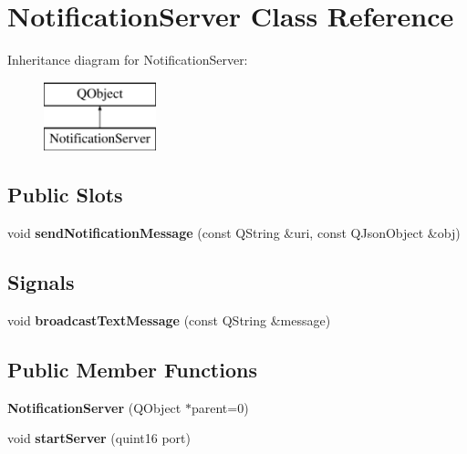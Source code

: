 \hypertarget{class_notification_server}{}\section{Notification\+Server Class Reference}
\label{class_notification_server}
Inheritance diagram for Notification\+Server\+:\begin{figure}[H]
\begin{center}
\leavevmode
\includegraphics[height=2.000000cm]{class_notification_server}
\end{center}
\end{figure}
\subsection*{Public Slots}
\begin{DoxyCompactItemize}
\item 
\mbox{\label{class_notification_server_a05d958280d812baf1e8a58c1be2f6537}} 
void {\bfseries send\+Notification\+Message} (const Q\+String \&uri, const Q\+Json\+Object \&obj)
\end{DoxyCompactItemize}
\subsection*{Signals}
\begin{DoxyCompactItemize}
\item 
\mbox{\label{class_notification_server_afd67abdb7fcb7a06878e85a3f9f203b2}} 
void {\bfseries broadcast\+Text\+Message} (const Q\+String \&message)
\end{DoxyCompactItemize}
\subsection*{Public Member Functions}
\begin{DoxyCompactItemize}
\item 
\mbox{\label{class_notification_server_a02f5762b8e41d1677163d13805d47906}} 
{\bfseries Notification\+Server} (Q\+Object $\ast$parent=0)
\item 
\mbox{\label{class_notification_server_a5e3a7df82c765939764c64a31339658e}} 
void {\bfseries start\+Server} (quint16 port)
\end{DoxyCompactItemize}
